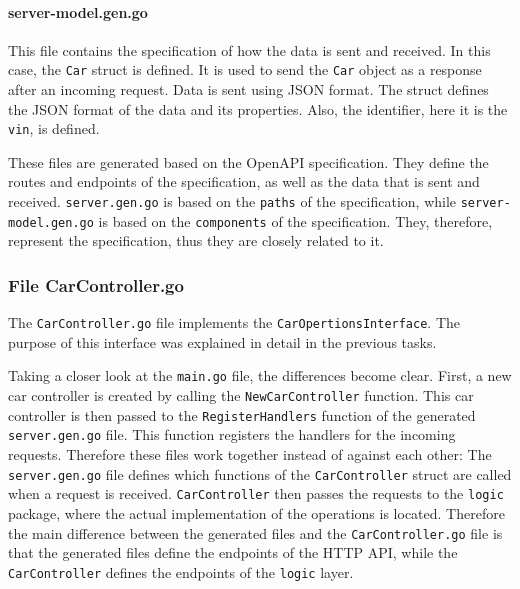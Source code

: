 \paragraph*{server-model.gen.go}
This file contains the specification of how the data is sent and received.
In this case, the \texttt{Car} struct is defined.
It is used to send the \texttt{Car} object as a response after an incoming request.
Data is sent using JSON format.
The struct defines the JSON format of the data and its properties.
Also, the identifier, here it is the \texttt{vin}, is defined.

These files are generated based on the OpenAPI specification.
They define the routes and endpoints of the specification, as well as the data that is sent and received.
\texttt{server.gen.go} is based on the \texttt{paths} of the specification, while \texttt{server-model.gen.go} is based on the \texttt{components} of the specification.
They, therefore, represent the specification, thus they are closely related to it.

\subsubsection*{File CarController.go}
The \texttt{CarController.go} file implements the \texttt{CarOpertionsInterface}.
The purpose of this interface was explained in detail in the previous tasks.

Taking a closer look at the \texttt{main.go} file, the differences become clear.
First, a new car controller is created by calling the \texttt{NewCarController} function.
This car controller is then passed to the \texttt{RegisterHandlers} function of the generated \texttt{server.gen.go} file.
This function registers the handlers for the incoming requests.
Therefore these files work together instead of against each other:
The \texttt{server.gen.go} file defines which functions of the \texttt{CarController} struct are called when a request is received.
\texttt{CarController} then passes the requests to the \texttt{logic} package, where the actual implementation of the operations is located.
Therefore the main difference between the generated files and the \texttt{CarController.go} file is that the generated files define the endpoints of the HTTP API, while the \texttt{CarController} defines the endpoints of the \texttt{logic} layer.

